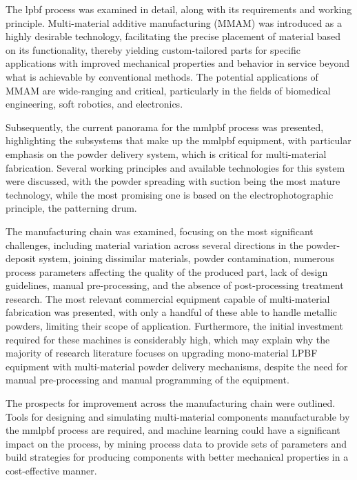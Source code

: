 The \gls{lpbf} process was examined in detail, along with its requirements and working principle. Multi-material additive manufacturing (MMAM) was introduced as a highly desirable technology, facilitating the precise placement of material based on its functionality, thereby yielding custom-tailored parts for specific applications with improved mechanical properties and behavior in service beyond what is achievable by conventional methods. The potential applications of MMAM are wide-ranging and critical, particularly in the fields of biomedical engineering, soft robotics, and electronics.

Subsequently, the current panorama for the \gls{mmlpbf} process was presented,
highlighting the subsystems that make up the \gls{mmlpbf} equipment, with particular emphasis on the powder delivery system, which is critical for multi-material fabrication. Several working principles and available technologies for this system were discussed, with the powder spreading with suction being the most mature technology, while the most promising one is based on the electrophotographic principle, the patterning drum.

The manufacturing chain was examined, focusing on the most significant challenges, including material variation across several directions in the powder-deposit system, joining dissimilar materials, powder contamination, numerous process parameters affecting the quality of the produced part, lack of design guidelines, manual pre-processing, and the absence of post-processing treatment research. The most relevant commercial equipment capable of multi-material fabrication was presented, with only a handful of these able to handle metallic powders, limiting their scope of application. Furthermore, the initial investment required for these machines is considerably high, which may explain why the majority of research literature focuses on upgrading mono-material LPBF equipment with multi-material powder delivery mechanisms, despite the need for manual pre-processing and manual programming of the equipment.

The prospects for improvement across the manufacturing chain were outlined. Tools for designing and simulating multi-material components manufacturable by the \gls{mmlpbf} process are required, and machine learning could have a significant impact on the process, by mining process data to provide sets of parameters and build strategies for producing components with better mechanical properties in a cost-effective manner.

